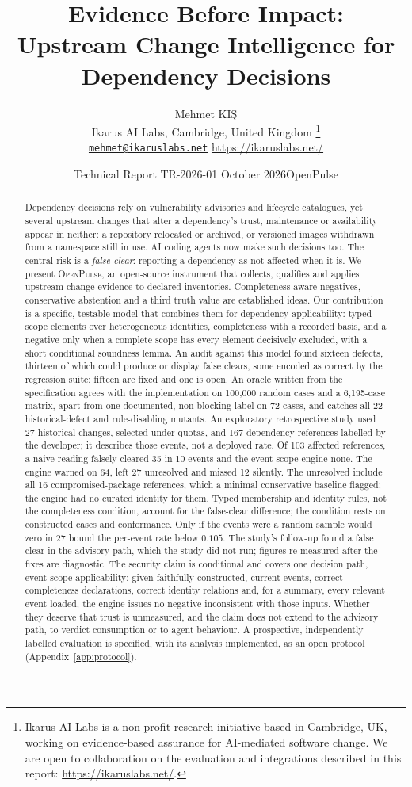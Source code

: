 \documentclass[11pt,a4paper]{article}
\title{Evidence Before Impact:\\
Upstream Change Intelligence for Dependency Decisions}
\author{Mehmet KI\c{S}\\
Ikarus AI Labs, Cambridge, United Kingdom%
\thanks{Ikarus AI Labs is a non-profit research initiative based in
Cambridge, UK, working on evidence-based assurance for AI-mediated
software change. We are open to collaboration on the evaluation and
integrations described in this report: \url{https://ikaruslabs.net/}.}\\
\href{mailto:mehmet@ikaruslabs.net}{\texttt{mehmet@ikaruslabs.net}}\quad
\url{https://ikaruslabs.net/}}
\date{Technical Report TR-2026-01\quad 31 October 2026\quad OpenPulse \release{}}
\newcommand{\op}{\textsc{OpenPulse}}
\begin{document}
\maketitle

\begin{abstract}
Dependency decisions rely on vulnerability advisories and lifecycle
catalogues, yet several upstream changes that alter a dependency's
trust, maintenance or availability appear in neither: a repository
relocated or archived, or versioned images withdrawn from a namespace
still in use. AI coding agents now make such decisions too. The
central risk is a \emph{false clear}: reporting a dependency as not
affected when it is. We present \op{}, an open-source instrument that
collects, qualifies and applies upstream change evidence to declared
inventories. Completeness-aware negatives, conservative abstention and a third
truth value are established ideas. Our contribution is a specific,
testable model that combines them for dependency applicability: typed
scope elements over heterogeneous identities, completeness with a
recorded basis, and a negative only when a complete scope has every
element decisively excluded, with a short conditional soundness lemma.
An audit against this model found sixteen defects, thirteen of which
could produce or display false clears, some encoded as correct by the
regression suite; fifteen are fixed and one is open. An oracle written
from the specification agrees with the implementation on 100{,}000
random cases and a 6{,}195-case matrix, apart from one documented,
non-blocking label on 72 cases, and catches all 22 historical-defect
and rule-disabling mutants. An exploratory retrospective study used 27
historical changes, selected under quotas, and 167 dependency
references labelled by the developer; it describes those events, not a
deployed rate. Of 103 affected references, a naive reading falsely
cleared 35 in 10 events and the event-scope engine none. The engine
warned on 64, left 27 unresolved and missed 12 silently. The unresolved include all 16 compromised-package
references, which a minimal conservative baseline flagged; the engine
had no curated identity for them. Typed membership and identity rules, not the
completeness condition, account for the false-clear difference; the
condition rests on constructed cases and conformance. Only if the
events were a random sample would zero in 27 bound the per-event rate
below $0.105$. The study's follow-up found a false clear in the advisory
path, which the study did not run; figures re-measured after the fixes
are diagnostic. The security
claim is conditional and covers one decision path, event-scope
applicability: given faithfully constructed, current events, correct
completeness declarations, correct identity relations and, for a
summary, every relevant event loaded, the engine issues no negative
inconsistent with those inputs. Whether they deserve that trust is
unmeasured, and the claim does not extend to the advisory path, to
verdict consumption or to agent behaviour. A prospective, independently
labelled evaluation is specified, with its analysis implemented, as an
open protocol (Appendix~\ref{app:protocol}).
\end{abstract}
\end{document}
